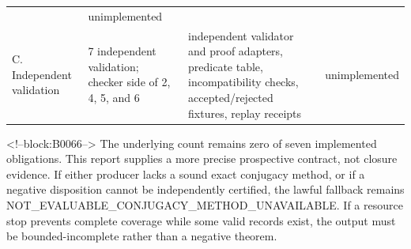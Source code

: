 \documentclass[11pt,a4paper]{article}
\begin{document}
\begin{longtable}[]{@{}llll@{}}
\begin{minipage}[t]{0.22\columnwidth}
\end{minipage} & \begin{minipage}[t]{0.22\columnwidth}\raggedright
unimplemented\strut
\end{minipage}\tabularnewline
\begin{minipage}[t]{0.22\columnwidth}\raggedright
C. Independent validation\strut
\end{minipage} & \begin{minipage}[t]{0.22\columnwidth}\raggedright
7 independent validation; checker side of 2, 4, 5, and 6\strut
\end{minipage} & \begin{minipage}[t]{0.22\columnwidth}\raggedright
independent validator and proof adapters, predicate table, incompatibility checks, accepted/rejected fixtures, replay receipts\strut
\end{minipage} & \begin{minipage}[t]{0.22\columnwidth}\raggedright
unimplemented\strut
\end{minipage}\tabularnewline
\bottomrule
\end{longtable}

<!--block:B0066-->
The underlying count remains zero of seven implemented obligations. This report supplies a more precise prospective contract, not closure evidence. If either producer lacks a sound exact conjugacy method, or if a negative disposition cannot be independently certified, the lawful fallback remains NOT\_EVALUABLE\_CONJUGACY\_METHOD\_UNAVAILABLE. If a resource stop prevents complete coverage while some valid records exist, the output must be bounded-incomplete rather than a negative theorem.
\end{document}
